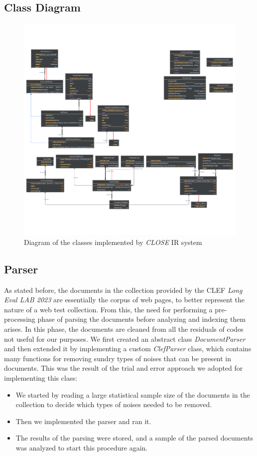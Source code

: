 \subsection{Class Diagram}
\begin{figure}[!h]
    \centering
    \includegraphics[width=0.8\linewidth]{figure/Classes_diagram_white.pdf}
    \caption{Diagram of the classes implemented by \textit{CLOSE} \ac{IR} system}
    \label{fig:Classes_diagram_white}
\end{figure}
\clearpage


\subsection{Parser} \label{parser_subsec}
As stated before, the documents in the collection provided by the \ac{CLEF} \textit{Long Eval LAB 2023} \cite{cleflongeval} are essentially the corpus of web pages, to better represent the nature of a web test collection. 
From this, the need for performing a pre-processing phase of parsing the documents before analyzing and indexing them arises.
In this phase, the documents are cleaned from all the residuals of codes not useful for our purposes. 
We first created an abstract class \textit{DocumentParser} and then extended it by implementing a custom \textit{ClefParser} class, which contains many functions for removing sundry types of noises that can be present in documents. 
This was the result of the trial and error approach we adopted for implementing this class:
\begin{itemize}
\item We started by reading a large statistical sample size of the documents in the collection to decide which types of noises needed to be removed.
\item Then we implemented the parser and ran it.
\item The results of the parsing were stored, and a sample of the parsed documents was analyzed to start this procedure again.
\end{itemize}

